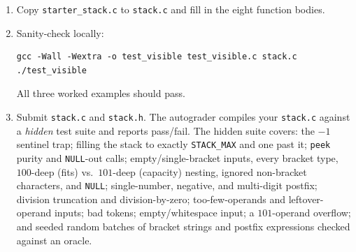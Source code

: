\documentclass[11pt]{article}
\begin{document}
\begin{enumerate}
  \item Copy \texttt{starter\_stack.c} to \texttt{stack.c} and fill in the eight function bodies.
  \item Sanity-check locally:
\begin{verbatim}
gcc -Wall -Wextra -o test_visible test_visible.c stack.c
./test_visible
\end{verbatim}
    All three worked examples should pass.
  \item Submit \texttt{stack.c} and \texttt{stack.h}. The autograder compiles your \texttt{stack.c} against a \emph{hidden} test suite and reports pass/fail. The hidden suite covers: the $-1$ sentinel trap; filling the stack to exactly \texttt{STACK\_MAX} and one past it; \texttt{peek} purity and \texttt{NULL}-out calls; empty/single-bracket inputs, every bracket type, $100$-deep (fits) vs.\ $101$-deep (capacity) nesting, ignored non-bracket characters, and \texttt{NULL}; single-number, negative, and multi-digit postfix; division truncation and division-by-zero; too-few-operands and leftover-operand inputs; bad tokens; empty/whitespace input; a $101$-operand overflow; and seeded random batches of bracket strings and postfix expressions checked against an oracle.
\end{enumerate}
\end{document}
